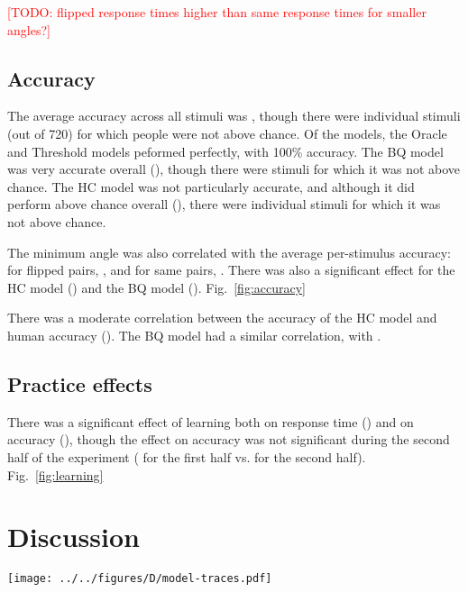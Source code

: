 \documentclass[10pt,letterpaper]{article}
\newcommand{\TODO}[1]{\textcolor{red}{[TODO: #1]}}
\newcommand{\Oc}[0]{Oracle}
\newcommand{\Th}[0]{Threshold}
\newcommand{\Hc}[0]{HC}
\newcommand{\Bq}[0]{BQ}
\begin{document}
\TODO{flipped response times higher than same response times for
  smaller angles?}

\subsection{Accuracy}

The average accuracy across all stimuli was \ExpAccuracy{}, though
there were \ExpNumChance{} individual stimuli (out of 720) for which
people were not above chance. Of the models, the \Oc{} and \Th{}
models peformed perfectly, with 100\% accuracy. The \Bq{} model was
very accurate overall (\BqAccuracy{}), though there were
\BqNumChance{} stimuli for which it was not above chance. The \Hc{}
model was not particularly accurate, and although it did perform above
chance overall (\HcAccuracy{}), there were \HcNumChance{} individual
stimuli for which it was not above chance.

The minimum angle was also correlated with the average per-stimulus
accuracy: for flipped pairs, \ExpThetaAccuracyCorrFlipped{}, and for
same pairs, \ExpThetaAccuracyCorrSame{}. There was also a significant
effect for the \Hc{} model (\HcThetaAccuracyCorr{}) and the
\Bq{} model
(\BqThetaAccuracyCorr{}). Fig.~\ref{fig:accuracy}

There was a moderate correlation between the accuracy of the \Hc{}
model and human accuracy (\ExpHcAccuracyCorr{}). The \Bq{} model had a
similar correlation, with \ExpBqAccuracyCorr{}.

\subsection{Practice effects} 

There was a significant effect of learning both on response time
(\ExpTrialTimeCorr{}) and on accuracy (\ExpTrialAccuracyCorr{}),
though the effect on accuracy was not significant during the second
half of the experiment (\ExpaTrialAccuracyCorr{} for the first half
vs. \ExpbTrialAccuracyCorr{} for the second
half). Fig.~\ref{fig:learning}


\section{Discussion}

\begin{figure*}[t]
  \begin{center}
    \texttt{[image: ../../figures/D/model-traces.pdf]}
    \caption{\textbf{Model traces.} \TODO{} \TODO{put pictures of the
        stimuli here}}
    \label{fig:model-traces}
  \end{center}
\end{figure*}
\end{document}
